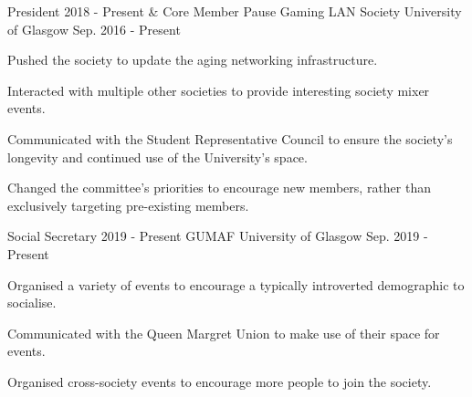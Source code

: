 

\begin{cventries}

  \cventry
    {President 2018 - Present \& Core Member} %
    {Pause Gaming LAN Society} %
    {University of Glasgow} %
    {Sep. 2016 - Present} %
    {
      \begin{cvitems} %
        \item Pushed the society to update the aging networking infrastructure.
        \item Interacted with multiple other societies to provide interesting society mixer events.
	\item Communicated with the Student Representative Council to ensure the society's longevity and continued use of the University's space.
	\item Changed the committee's priorities to encourage new members, rather than exclusively targeting pre-existing members.
      \end{cvitems}
    }
  \cventry
    {Social Secretary 2019 - Present}
    {GUMAF}
    {University of Glasgow}
    {Sep. 2019 - Present}
    {
      \begin{cvitems}
        \item Organised a variety of events to encourage a typically introverted demographic to socialise.
	\item Communicated with the Queen Margret Union to make use of their space for events.
	\item Organised cross-society events to encourage more people to join the society.
      \end{cvitems}
    }

\end{cventries}
